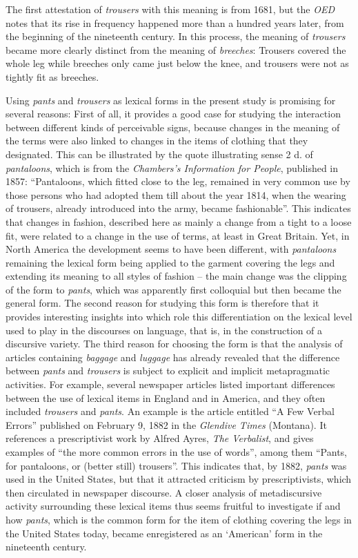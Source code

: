 The first attestation of \emph{trousers} with this meaning is from 1681, but the \emph{OED} notes that its rise in frequency happened more than a hundred years later, from the beginning of the nineteenth century. In this process, the meaning of \emph{trousers} became more clearly distinct from the meaning of \emph{breeches}: Trousers covered the whole leg while breeches only came just below the knee, and trousers were not as tightly fit as breeches.


Using \emph{pants} and \emph{trousers} as lexical forms in the present study is promising for several reasons: First of all, it provides a good case for studying the interaction between different kinds of perceivable signs, because changes in the meaning of the terms were also linked to changes in the items of clothing that they designated. This can be illustrated by the quote illustrating sense 2 d. of \emph{pantaloons}, which is from the \emph{Chambers’s Information for People}, published in 1857: “Pantaloons, which fitted close to the leg, remained in very common use by those persons who had adopted them till about the year 1814, when the wearing of trousers, already introduced into the army, became fashionable”. This indicates that changes in fashion, described here as mainly a change from a tight to a loose fit, were related to a change in the use of terms, at least in Great Britain. Yet, in North America the development seems to have been different, with \emph{pantaloons} remaining the lexical form being applied to the garment covering the legs and extending its meaning to all styles of fashion – the main change was the clipping of the form to \emph{pants}, which was apparently first colloquial but then became the general form. The second reason for studying this form is therefore that it provides interesting insights into which role this differentiation on the lexical level used to play in the discourses on language, that is, in the construction of a discursive variety. The third reason for choosing the form is that the analysis of articles containing \emph{baggage} and \emph{luggage} has already revealed that the difference between \emph{pants} and \emph{trousers} is subject to explicit and implicit metapragmatic activities. For example, several newspaper articles listed important differences between the use of lexical items in England and in America, and they often included \emph{trousers} and \emph{pants}. An example is the article entitled “A Few Verbal Errors” published on February 9, 1882 in the \emph{Glendive Times} (Montana). It references a prescriptivist work by Alfred Ayres, \emph{The Verbalist}, and gives examples of “the more common errors in the use of words”, among them “Pants, for pantaloons, or (better still) trousers”. This indicates that, by 1882, \emph{pants} was used in the United States, but that it attracted criticism by prescriptivists, which then circulated in newspaper discourse. A closer analysis of metadiscursive activity surrounding these lexical items thus seems fruitful to investigate if and how \emph{pants}, which is the common form for the item of clothing covering the legs in the United States today, became enregistered as an ‘American’ form in the nineteenth century.

